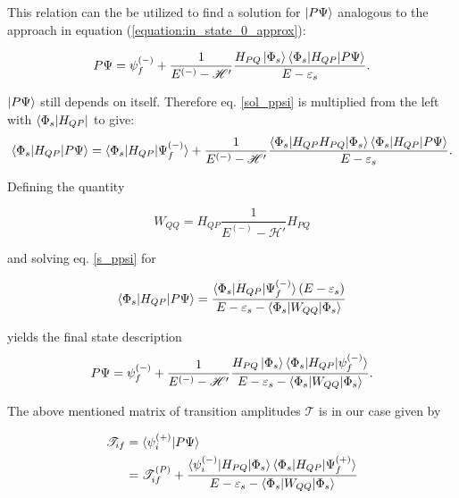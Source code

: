 This relation can the be utilized to find a solution for $\ket{P \Psi}$ analogous
to the approach in equation (\ref{equation:in_state_0_approx}):

\begin{equation}\label{sol_ppsi}
  P \Psi = \psi_f^{(-)} + \frac{1}{E^{(-)} - \mathscr{H}'}
           \frac{H_{PQ}\ket{\Phi_s}
           \braket{\Phi_s|H_{QP}|P\Psi}}{E - \varepsilon_s} .
\end{equation}

$\ket{P \Psi}$ still depends on itself. Therefore 
eq. \ref{sol_ppsi}
is multiplied from the left with $\bra{\Phi_s|H_{QP}}$ to give:
\begin{equation}
  \braket{\Phi_s|H_{QP}|P\Psi} = \braket{\Phi_s|H_{QP}|\Psi_f^{(-)}} +
  \frac{1}{E^{(-)} - \mathscr{H}'}
  \frac{\braket{\Phi_s|H_{QP}H_{PQ}|\Phi_s} \braket{\Phi_s|H_{QP}|P\Psi}}
       {E - \varepsilon_s}  \label{s_ppsi} .
\end {equation}

Defining the quantity

\begin{equation}
  W_{QQ} = H_{QP}\frac{1}{E^{(-)} - \mathscr{H}'}H_{PQ}
\end{equation}

and solving eq. \ref{s_ppsi} for

\begin{equation}
  \braket{\Phi_s|H_{QP}|P\Psi} = \frac{\braket{\Phi_s|H_{QP}|\Psi_f^{(-)}}(E-\varepsilon_s)}
{E - \varepsilon_s - \braket{\Phi_s|W_{QQ}|\Phi_s}}
\end{equation}

yields the final state description
\begin{equation}\label{}
  P \Psi = \psi_f^{(-)} + \frac{1}{E^{(-)} - \mathscr{H}'}
           \frac{H_{PQ}\ket{\Phi_s}
           \braket{\Phi_s|H_{QP}|\psi_f^{(-)}}}
           {E - \varepsilon_s - \braket{\Phi_s|W_{QQ}|\Phi_s}} .
\end{equation}



The above mentioned matrix of transition amplitudes $\mathcal{T}$
is in our case given by


\begin{align}
  \mathscr{T}_{if} &= \braket{\psi_i^{(+)} | P\Psi} \\
                   &= \mathscr{T}_{if}^{(P)} + 
                     \frac{\braket{\psi_i^{(-)}|H_{PQ}|\Phi_s}
                           \braket{\Phi_s|H_{QP}|\Psi_f^{(+)}}}
                          {E-\varepsilon_s - \braket{\Phi_s|W_{QQ}|\Phi_s}}
\end{align}

